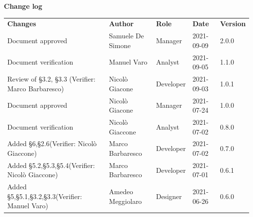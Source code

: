 \documentclass[a4paper]{article}
\begin{document}
\begin{titlepage}
\begin{center}
    \end{center}
\end{titlepage}

\begin{center}
    \textbf{\Large Change log}\\
    \vspace{10px}
    \begin{table}[h!]
        \centering
        \renewcommand{\arraystretch}{1.8}
        \begin{tabular}{p{150px} p{90px} p{80px} p{60px} p{45px}}
            \rowcolor{logo!70} \textbf{Changes}                                                    & \textbf{Author}   & \textbf{Role} & \textbf{Date} & \textbf{Version} \\
            Document approved                                                                      & Samuele De Simone & Manager       & 2021-09-09    & 2.0.0            \\
            Document verification                                                                  & Manuel Varo       & Analyst       & 2021-09-05    & 1.1.0            \\
            Review of   \S{3.2}, \S{3.3}  \newline(Verifier: Marco Barbaresco)                     & Nicolò Giacone    & Developer     & 2021-09-03    & 1.0.1            \\
            Document approved                                                                      & Nicolò Giacone    & Manager       & 2021-07-24    & 1.0.0            \\
            Document verification                                                                  & Nicolò Giaccone   & Analyst       & 2021-07-02    & 0.8.0            \\
            Added \S{6},\S{2.6}\newline(Verifier: Nicolò Giaccone)                                 & Marco Barbaresco  & Developer     & 2021-07-02    & 0.7.0            \\
            Added \S{5.2},\S{5.3},\S{5.4}\newline(Verifier: Nicolò Giaccone)                       & Marco Barbaresco  & Developer     & 2021-07-01    & 0.6.1            \\
            Added \S{5},\S{5.1},\S{3.2},\S{3.3}\newline(Verifier: Manuel Varo)                     & Amedeo Meggiolaro & Designer      & 2021-06-26    & 0.6.0            \\

\end{tabular}
\end{table}
\end{center}
\end{document}
